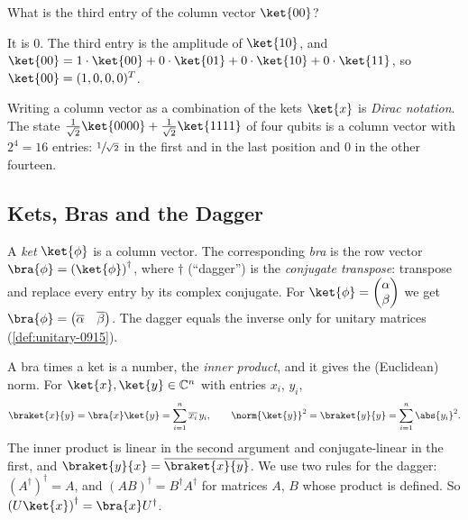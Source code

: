 \begin{exercisebox}
\begin{exercise}\label{ex:basis-0915}
    What is the third entry of the column vector $\ket{00}$?
\end{exercise}
\tcblower
\begin{wsolution}
    It is $0$. The third entry is the amplitude of $\ket{10}$, and
    $\ket{00} = 1 \cdot \ket{00} + 0 \cdot \ket{01} + 0 \cdot \ket{10} + 0 \cdot \ket{11}$, so
    $\ket{00} = (1, 0, 0, 0)^T$.
\end{wsolution}
\end{exercisebox}

Writing a column vector as a combination of the kets $\ket{x}$ is \emph{Dirac notation}. The state
$\frac{1}{\sqrt{2}} \ket{0000} + \frac{1}{\sqrt{2}} \ket{1111}$ of four qubits is a column vector
with $2^4 = 16$ entries: $\sfrac{1}{\sqrt{2}}$ in the first and in the last position and $0$ in the
other fourteen.

\subsection{Kets, Bras and the Dagger}

A \emph{ket} $\ket{\phi}$ is a column vector. The corresponding \emph{bra} is the row vector
$\bra{\phi} = \left(\ket{\phi}\right)^\dagger$, where $\dagger$ (``dagger'') is the
\emph{conjugate transpose}: transpose and replace every entry by its complex conjugate. For
$\ket{\phi} = \begin{pmatrix} \alpha \\ \beta \end{pmatrix}$ we get
$\bra{\phi} = \begin{pmatrix} \overline{\alpha} & \overline{\beta} \end{pmatrix}$. The dagger equals
the inverse only for unitary matrices (\cref{def:unitary-0915}).

A bra times a ket is a number, the \emph{inner product}, and it gives the (Euclidean) norm. For
$\ket{x}, \ket{y} \in \mathbb{C}^n$ with entries $x_i$, $y_i$,
\[\braket{x}{y} = \bra{x} \ket{y} = \sum_{i=1}^{n} \overline{x_i} \, y_i,
    \qquad
    \norm{\ket{y}}^2 = \braket{y}{y} = \sum_{i=1}^{n} \abs{y_i}^2.\]
The inner product is linear in the second argument and conjugate-linear in the first, and
$\braket{y}{x} = \overline{\braket{x}{y}}$. We use two rules for the dagger:
$(A^\dagger)^\dagger = A$, and $(AB)^\dagger = B^\dagger A^\dagger$ for matrices $A$, $B$ whose
product is defined. So $\left(U \ket{x}\right)^\dagger = \bra{x} U^\dagger$.

